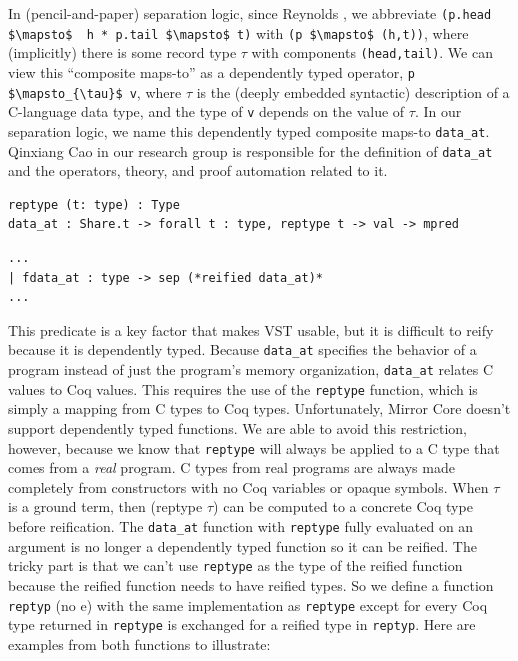 \documentclass{puthesis}
\begin{document}
In (pencil-and-paper) separation logic, since Reynolds
\cite{reynolds02}, we abbreviate 
\lstinline|(p.head $\mapsto$  h * p.tail $\mapsto$ t)| with 
\lstinline|(p $\mapsto$ (h,t))|, where (implicitly) there is some record type $\tau$ with
components \lstinline|(head,tail)|.  We can view this ``composite maps-to'' as a
dependently typed operator, \lstinline|p $\mapsto_{\tau}$ v|, where $\tau$ is the (deeply
embedded syntactic) description of a C-language data type, and the
type of \lstinline|v| depends on the value of $\tau$.  In our separation logic, we
name this dependently typed composite maps-to
\lstinline|data_at|. Qinxiang Cao in our research group is responsible
for the definition of \lstinline|data_at| and the operators, theory, and proof automation related to it.

\begin{lstlisting}
reptype (t: type) : Type
data_at : Share.t -> forall t : type, reptype t -> val -> mpred
\end{lstlisting}
\begin{lstlisting}
...
| fdata_at : type -> sep (*reified data_at)*
...
\end{lstlisting}

This predicate is a key factor that makes VST usable, but it is
difficult to reify because it is dependently typed.
Because \lstinline|data_at| specifies the behavior of a program
instead of just the program's memory organization, \lstinline|data_at|
relates C values to Coq values. This requires the use of the
\lstinline|reptype| function, which is simply a mapping from C types
to Coq types. Unfortunately, Mirror Core doesn't support dependently
typed functions. We are able to avoid this restriction, however,
because we know that \lstinline|reptype| will always be applied to a C
type that comes from a \emph{real} program. C types from real programs
are always made completely from constructors with no Coq variables or
opaque symbols.  When $\tau$ is a ground term, then (reptype $\tau$) can be
computed to a concrete Coq type before reification. The
\lstinline|data_at| function with \lstinline|reptype| fully
evaluated on an argument is no longer a dependently typed function so
it can be reified. The tricky part is that we can't use
\lstinline|reptype| as the type of the reified function because the
reified function needs to have reified types. So we define a function
\lstinline|reptyp| (no e) with the same implementation as
\lstinline|reptype| except for every Coq type returned in
\lstinline|reptype| is exchanged for a reified type in
\lstinline|reptyp|. Here are examples from both functions to
illustrate:
\end{document}
